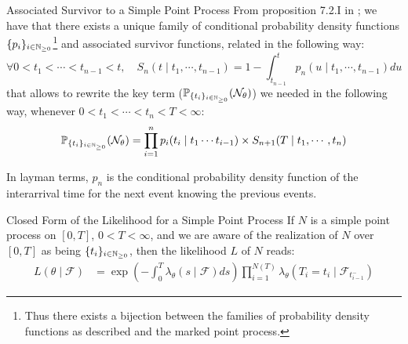 \begin{theoreme}{Associated Survivor to a Simple Point Process}
From proposition 7.2.I in \cite{daley}; we have that there exists a unique family of conditional probability density functions $\{ p_i \}_{ i \in \mathbb{N}_{\geq 0}}$\footnote{Thus there exists a bijection between the families of probability density functions as described and the marked point process.} and associated survivor functions, related in the following way:
\begin{equation}
\forall 0 < t_1 < \cdots < t_{n-1} < t, \quad S_n( t \mid t_1, \cdots, t_{n-1} ) = 1 - \int_{t_{n-1}}^t p_n ( u \mid t_1, \cdots, t_{n-1} ) du
\end{equation}
that allows to rewrite the key term ($\mathbb P_{\{ t_i \}_{ i \in \mathbb{N}_{\geq 0}}} ( \mathcal N_{\theta} )$) we needed in the following way, whenever $0 < t_1 < \cdots < t_{n} < T < \infty $:
\begin{equation}
\mathbb P_{\{ t_i \}_{ i \in \mathbb{N}_{\geq 0}}} ( \mathcal N_{\theta} )  =   \prod_{i = 1}^n p_i ( t_i \mid t_1 \cdots t_{i-1} ) \times S_{n+1} ( T \mid t_1, \cdots, t_n )  
\end{equation}
\end{theoreme}


\begin{remarque}
In layman terms, $p_n$ is the conditional probability density function of the interarrival time for the next event knowing the previous events.
\end{remarque}


\begin{theoreme}[label = theoreme_expression_ln_lik]{Closed Form of the Likelihood for a Simple Point Process}
If $N$ is a simple point process on $[0,T]$,  $0 < T < \infty$, and we are aware of the realization of $N$ over $[0,T]$ as being $\{ t_i \}_{ i \in \mathbb{N}_{\geq 0}}$, then the likelihood $L$ of $N$ reads:
\begin{align}
L( \theta \mid \mathcal F ) &= \exp \left ( - \int_{0}^{T} \lambda_{\theta} ( s \mid \mathcal F ) ds \right )  \prod_{i=1}^{N(T)}  \lambda_{\theta} ( T_i = t_i \mid \mathcal F_{t_{i-1}^-} )  
\end{align}
\end{theoreme}


